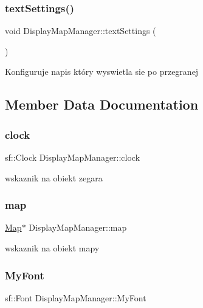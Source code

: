 \subsubsection{\texorpdfstring{text\+Settings()}{textSettings()}}
{\footnotesize\ttfamily void Display\+Map\+Manager\+::text\+Settings (\begin{DoxyParamCaption}{ }\end{DoxyParamCaption})}

Konfiguruje napis który wyswietla sie po przegranej 

\subsection{Member Data Documentation}
\mbox{\label{class_display_map_manager_ad04d2e96cd8ba8f1cbcf3425bd28cfc5}} 
\subsubsection{\texorpdfstring{clock}{clock}}
{\footnotesize\ttfamily sf\+::\+Clock Display\+Map\+Manager\+::clock}

wskaznik na obiekt zegara \mbox{\label{class_display_map_manager_aefa663d75781e47edfc5629e3652ead8}} 
\subsubsection{\texorpdfstring{map}{map}}
{\footnotesize\ttfamily \hyperlink{class_map}{Map}$\ast$ Display\+Map\+Manager\+::map}

wskaznik na obiekt mapy \mbox{\label{class_display_map_manager_af1ea34885ea77010e9a99b6a49da5e58}} 
\subsubsection{\texorpdfstring{My\+Font}{MyFont}}
{\footnotesize\ttfamily sf\+::\+Font Display\+Map\+Manager\+::\+My\+Font}


